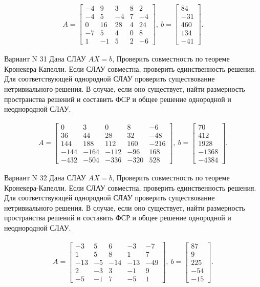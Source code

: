 \documentclass[11pt]{report}
\begin{document}
\begin{align*}
 A = \left[\begin{matrix}-4 & 9 & 3 & 8 & 2\\-4 & 5 & -4 & 7 & -4\\0 & 16 & 28 & 4 & 24\\-7 & 5 & 4 & 0 & 8\\1 & -1 & 5 & 2 & -6\end{matrix}\right],
\ b = \left[\begin{matrix}84\\-31\\460\\134\\-41\end{matrix}\right]. 
 \end{align*}

Вариант N 31
Дана СЛАУ $AX = b$,
Проверить совместность по теореме Кронекера-Капелли. Если СЛАУ совместна, проверить единственность решения.
Для соответствующей однородной СЛАУ проверить существование нетривиального решения. В случае, если оно существует,
найти размерность пространства решений и составить ФСР и общее решение однородной  и неоднородной СЛАУ.


\begin{align*}
 A = \left[\begin{matrix}0 & 3 & 0 & 8 & -6\\36 & 44 & 28 & 32 & -48\\144 & 188 & 112 & 160 & -216\\-144 & -164 & -112 & -96 & 168\\-432 & -504 & -336 & -320 & 528\end{matrix}\right],
\ b = \left[\begin{matrix}70\\412\\1928\\-1368\\-4384\end{matrix}\right]. 
 \end{align*}

Вариант N 32
Дана СЛАУ $AX = b$,
Проверить совместность по теореме Кронекера-Капелли. Если СЛАУ совместна, проверить единственность решения.
Для соответствующей однородной СЛАУ проверить существование нетривиального решения. В случае, если оно существует,
найти размерность пространства решений и составить ФСР и общее решение однородной  и неоднородной СЛАУ.


\begin{align*}
 A = \left[\begin{matrix}-3 & 5 & 6 & -3 & -7\\1 & 5 & 8 & 1 & 7\\-13 & -5 & -14 & -13 & -49\\2 & -3 & 3 & -1 & 9\\-5 & -1 & 7 & -5 & 1\end{matrix}\right],
\ b = \left[\begin{matrix}87\\9\\225\\-54\\-15\end{matrix}\right]. 
 \end{align*}
\end{document}
